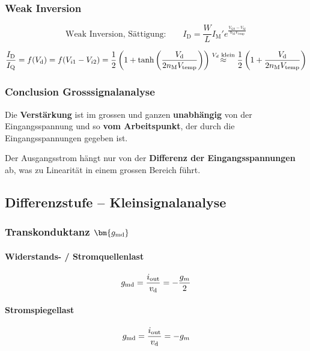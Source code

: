 \subsubsection{Weak Inversion}

\vspace{-0.2cm}

\[
    \text{Weak Inversion, Sättigung:} \qquad I_\text{D} = \frac{W}{L} I_\text{M}' e^\frac{V_\text{GS}-V_\text{M}}{n_\text{M} V_\text{temp}}
\]

\vspace{-0.2cm}

\[
    \frac{I_\text{D}}{I_\text{Q}} = f(V_{\rm d}) = f(V_{i1} - V_{i2}) = \frac{1}{2} \left(1 + \tanh \left( \frac{V_\text{d}}{2 n_\text{M} V_\text{temp}} \right) \right)
     \overset{V_d \text{ klein}}{\approx} \frac{1}{2} \left(1+\frac{V_\text{d}}{2 n_\text{M} V_\text{temp}}\right)
\]


\subsubsection{Conclusion Grosssignalanalyse}

Die \textbf{Verstärkung} ist im grossen und ganzen \textbf{unabhängig} von der Eingangsspannung und so \textbf{vom Arbeitspunkt}, der durch die Eingangsspannungen gegeben ist.

\smallskip

Der Ausgangsstrom hängt nur von der \textbf{Differenz der Eingangsspannungen} ab, was zu Linearität in einem grossen Bereich führt.


\subsection{Differenzstufe -- Kleinsignalanalyse}
\label{Differenzstufe -- Kleinsignalanalyse}

\subsubsection{Transkonduktanz $\bm{g_{\rm md}}$}


\begin{minipage}[t]{0.48\columnwidth}
    \paragraph{Widerstands- / Stromquellenlast}

    \[
        g_{\rm md} = \frac{i_{\rm out}}{v_{\rm d}} = - \frac{g_m}{2}
    \]
\end{minipage}
\hfill
\begin{minipage}[t]{0.48\columnwidth}
    \paragraph{Stromspiegellast}

    \[
        g_{\rm md} = \frac{i_{\rm out}}{v_{\rm d}} = - g_m
    \]
\end{minipage}


